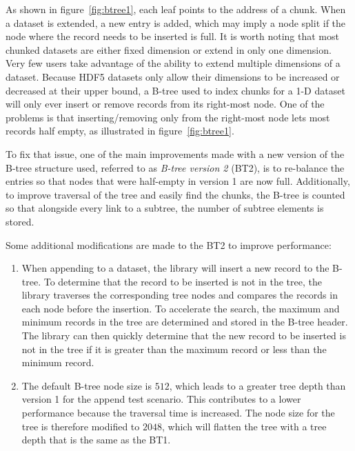 As shown in figure~\ref{fig:btree1}, each leaf points to the address of a
chunk. When a dataset is extended, a new entry is added, which may
imply a node split if the node where the record needs to be inserted is full. 
It is worth noting that most chunked datasets are either fixed dimension or
extend in only one dimension. Very few users take advantage of the ability to 
extend multiple dimensions of a dataset.
Because HDF5 datasets only allow their dimensions to be increased or 
decreased at their upper bound, a B-tree used to index chunks for a 1-D 
dataset will only ever insert or remove records from its right-most node.
One of the problems is that inserting/removing only from the right-most
node lets most records half empty, as illustrated in 
figure~\ref{fig:btree1}.

To fix that issue, one of the main improvements made with a new version of
the B-tree structure used, referred to as \textit{B-tree version 2} (BT2), is to
re-balance the entries so that nodes that were half-empty in version 1 are
now full. Additionally, to improve traversal of the tree and easily find the
chunks, the B-tree is counted so that alongside every link to a subtree, the
number of subtree elements is stored.

Some additional modifications are made to the BT2 to improve performance:
\begin{enumerate}
\item
When appending to a dataset, the library will insert a new record to the
B-tree. To determine that the record to be inserted is not in the tree,
the library traverses the corresponding tree nodes and compares the records 
in each node before the insertion.
To accelerate the search, the maximum and minimum records in the tree are 
determined and stored in the B-tree header. The library can then quickly 
determine that the new record to be inserted is not in the tree if it is 
greater than the maximum record or less than the minimum record.
\item
The default B-tree node size is $512$, which leads to a greater tree depth
than version 1 for the append test scenario. This contributes to a lower
performance because the traversal time is increased. The node size for the
tree is therefore modified to $2048$, which will flatten the tree with a tree 
depth that is the same as the BT1.
\end{enumerate}

